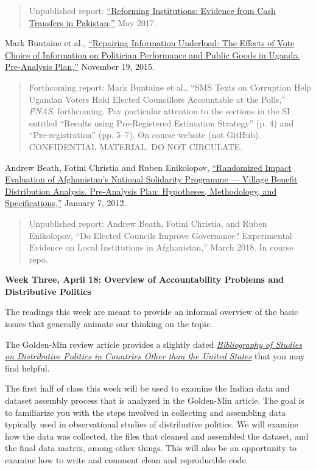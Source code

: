 \documentclass[11pt]{article}
\begin{document}
\begin{quote}
Unpublished report: \href{https://docs.google.com/viewer?a=v&pid=sites&srcid=ZGVmYXVsdGRvbWFpbnxrdnlib3JueXxneDo1ZjRiMmYyNDgxMmJlMzQ4}{``Reforming Institutions: Evidence from Cash Transfers in Pakistan,''} May 2017.
\end{quote}

Mark Buntaine et al., \href{http://egap.org/registration/1615}{``Repairing Information Underload: The Effects of Vote Choice of Information on Politician Performance and Public Goods in Uganda. Pre-Analysis Plan,''} November 19, 2015.

\begin{quote}
Forthcoming report: Mark Buntaine et al., ``SMS Texts on Corruption Help Ugandan Voters Hold Elected Councillors Accountable at the Polls,'' \textit{PNAS}, forthcoming. Pay particular attention to the sections in the SI entitled ``Results using Pre-Registered Estimation Strategy'' (p. 4) and ``Pre-registration'' (pp. 5--7). On course website (not GitHub). CONFIDENTIAL MATERIAL. DO NOT CIRCULATE.
\end{quote}

Andrew Beath, Fotini Christia and Ruben Enikolopov, \href{http://egap.org/registration/603}{``Randomized Impact Evaluation of Afghanistan's National Solidarity Programme --- Village Benefit Distribution Analysis. Pre-Analysis Plan: Hypotheses, Methodology, and Specifications,''} January 7, 2012.

\begin{quote}
Unpublished report: Andrew Beath, Fotini Christia, and Ruben Enikolopov, ``Do Elected Councils Improve Governance? Experimental Evidence on Local Institutions in Afghanistan,'' March 2018. In course repo. 
\end{quote}



\textbf{Week Three, April 18: Overview of Accountability Problems and Distributive Politics}

The readings this week are meant to provide an informal overview of the basic issues that generally animate our thinking on the topic.


The Golden-Min review article provides a slightly dated \href{http://www.annualreviews.org/doi/suppl/10.1146/annurev-polisci-052209-121553/suppl_file/pl16_golden_supmat_biblio.pdf}{\textit{Bibliography of Studies on Distributive Politics in Countries
Other than the United States}} that you may find helpful. 

The first half of class this week will be used to examine the Indian data and dataset assembly process that is analyzed in the Golden-Min article. The
goal is to familiarize you with the steps involved in collecting and assembling data typically used in observational studies of distributive politics. We will examine how the data was collected, the files that cleaned and assembled the dataset, and the final data matrix, among other things.  This will also be an opportunity to examine how to write and comment clean and reproducible code. 
\end{document}
